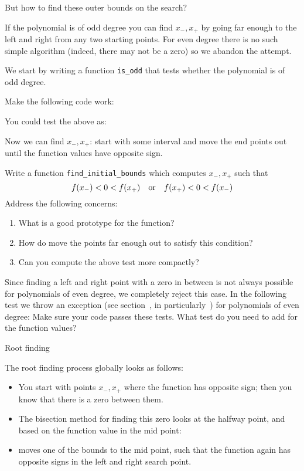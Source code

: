 But how to find these outer bounds on the search?

If the polynomial is of odd degree you can find $x_-,x_+$
by going far enough to the left and right
from any two starting points.
For even degree there is no such simple algorithm
(indeed, there may not be a zero)
so we abandon the attempt.

We start by writing a function \lstinline+is_odd+ that tests
whether the polynomial is of odd degree.

\begin{exercise}
  \label{ex:bisect-odd}
  Make the following code work:
\end{exercise}

You could test the above as:

Now we can find $x_-,x_+$: start with some interval
and move the end points out until the function values have opposite sign.

\begin{exercise}
  \label{ex:bisect-outer}
  Write a function \lstinline+find_initial_bounds+ which computes $x_-,x_+$
  such that
  \[ f(x_-)<0<f(x_+) \quad\hbox{or}\quad f(x_+)<0<f(x_-) \]
  Address the following concerns:
  \begin{enumerate}
  \item
    What is a good prototype for the function?
  \item
    How do move the points far enough out to satisfy this condition?
  \item
    Can you compute the above test more compactly?
  \end{enumerate}
\end{exercise}

Since finding a left and right point with a zero in between is not always
possible for polynomials of even degree, we completely reject this case.
In the following test we throw an exception
(see section~, in particularly~)
for polynomials of even degree:
Make sure your code passes these tests.
What test do you need to add
for the function values?

 {Root finding}

The root finding process globally looks as follows:
\begin{itemize}
\item You start with points $x_-,x_+$ where the function has
  opposite sign; then you know that there is a zero between them.
\item 
  The bisection method for finding this zero
  looks at the halfway point, and based on the function value
  in the mid point:
\item moves one of the bounds to the mid point, such that the function
  again has opposite signs in the left and right search point.
\end{itemize}

